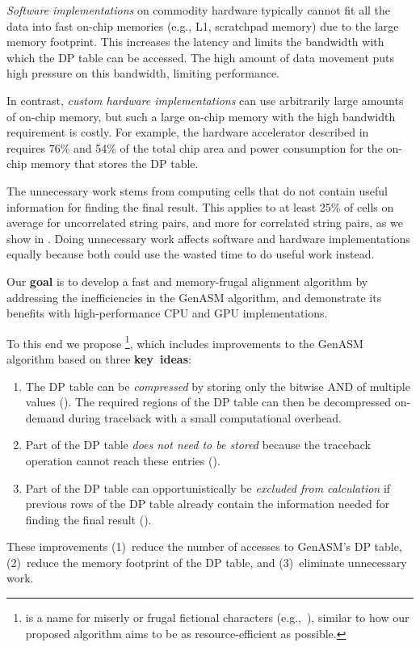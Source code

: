 \emph{Software implementations} on commodity hardware typically cannot
fit all the data into fast on-chip memories (e.g., L1, scratchpad memory) due to the large memory footprint. This increases the latency and limits the bandwidth with which the DP table can be accessed. The high amount of data movement puts high pressure on this bandwidth, limiting performance.

In contrast, \emph{custom hardware implementations} can use arbitrarily large amounts of on-chip memory, but such a large on-chip memory with the high bandwidth requirement is costly. For example, the hardware accelerator described in~\citep{cali2020genasm} requires 76\% and 54\% of the total chip area and power consumption
for the on-chip memory that stores the DP table.

The unnecessary work stems from computing cells that do not contain useful information for finding the final result. This applies to at least 25\% of cells on average for uncorrelated string pairs, and more for correlated string pairs, as we show in . Doing unnecessary work affects software and hardware implementations equally because both could use the wasted time to do useful work instead.


Our \textbf{goal}
is to develop a fast and memory-frugal alignment algorithm by addressing the inefficiencies in the GenASM algorithm, and demonstrate its benefits with high-performance CPU and GPU implementations.


To this end we propose \toolname\footnote{\emph{\toolname} is a name for miserly or frugal fictional characters (e.g.,~\citep{dickens1843achristmascarol}), similar to how our proposed algorithm aims to be as resource-efficient as possible.}, which includes improvements to the GenASM algorithm based on three \textbf{key~ideas}:
\begin{enumerate}
    \item The DP table can be \emph{compressed} by storing only the bitwise AND of multiple values (). The required regions of the DP table can then be decompressed on-demand during traceback with a small computational overhead.
    \item Part of the DP table \emph{does not need to be stored} because the traceback operation cannot reach these entries ().
    \item Part of the DP table can opportunistically be \emph{excluded from calculation} if previous rows of the DP table already contain the information needed for finding the final result ().
\end{enumerate}
These improvements (1)~reduce the number of accesses to GenASM's DP table, (2)~reduce the memory footprint of the DP table, and (3)~eliminate unnecessary work. %

